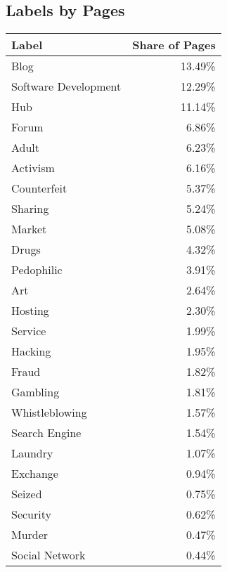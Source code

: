 \subsection{Labels by Pages}
\label{appendix:labelsByPages}
\ifdgruyter
\begin{center}
    \begin{supertabular}[H]{l|r}
    \textbf{Label}		&	\textbf{Share of Pages}\\
	\hline
	\hline
	Blog		&	13.49\%\\
	\hline
	Software Development	&	12.29\%\\
	\hline
	Hub		&	11.14\%\\
	\hline
	Forum		&	6.86\%\\
	\hline
	Adult		&	6.23\%\\
	\hline
	Activism	&	6.16\%\\
	\hline
	Counterfeit	&	5.37\%\\
	\hline
	Sharing		&	5.24\%\\
	\hline
	Market		&	5.08\%\\
	\hline
	Drugs		&	4.32\%\\
	\hline
	Pedophilic	&	3.91\%\\
	\hline
	Art			&	2.64\%\\
	\hline
	Hosting		&	2.30\%\\
	\hline
	Service		&	1.99\%\\
	\hline
	Hacking		&	1.95\%\\
	\hline
	Fraud		&	1.82\%\\
	\hline
	Gambling	&	1.81\%\\
	\hline
	Whistleblowing			&	1.57\%\\
	\hline
	Search Engine			&	1.54\%\\
	\hline
	Laundry		&	1.07\%\\
	\hline
	Exchange	&	0.94\%\\
	\hline
	Seized		&	0.75\%\\
	\hline
	Security	&	0.62\%\\
	\hline
	Murder		&	0.47\%\\
	\hline
	Social Network			&	0.44\%\\
    \end{supertabular}
\end{center}
\fi

